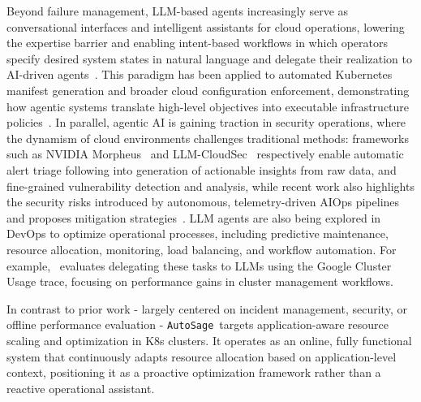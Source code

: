 \documentclass[sigconf]{acmart}
\newcommand{\Solution}{\texttt{AutoSage}}
\begin{document}
Beyond failure management, LLM-based agents increasingly serve as conversational interfaces and intelligent assistants for cloud operations, lowering the expertise barrier and enabling intent-based workflows in which operators specify desired system states in natural language and delegate their realization to AI-driven agents~\cite{yunjchoi2023conversational,kapoor2025aiops}. This paradigm has been applied to automated Kubernetes manifest generation and broader cloud configuration enforcement, demonstrating how agentic systems translate high-level objectives into executable infrastructure policies~\cite{dubey2024leveraging,sacco2025intent,brodimas2025intent,mekrache2024intent}. In parallel, agentic AI is gaining traction in security operations, where the dynamism of cloud environments challenges traditional methods: frameworks such as NVIDIA Morpheus~\cite{huang_nandakumar2024augmenting} and LLM-CloudSec~\cite{cao2024llm} respectively enable automatic alert triage following into generation of actionable insights from raw data, and fine-grained vulnerability detection and analysis, while recent work also highlights the security risks introduced by autonomous, telemetry-driven AIOps pipelines and proposes mitigation strategies~\cite{pasquini2025aiops}.
%
LLM agents are also being explored in DevOps to optimize operational processes, including predictive maintenance, resource allocation, monitoring, load balancing, and workflow automation. For example,~\cite{bokkena2024optimizing} evaluates delegating these tasks to LLMs using the Google Cluster Usage trace, focusing on performance gains in cluster management workflows.

In contrast to prior work - largely centered on incident management, security, or offline performance evaluation - \Solution\ targets application-aware resource scaling and optimization in K8s clusters. It operates as an online, fully functional system that continuously adapts resource allocation based on application-level context, positioning it as a proactive optimization framework rather than a reactive operational assistant.
\end{document}
